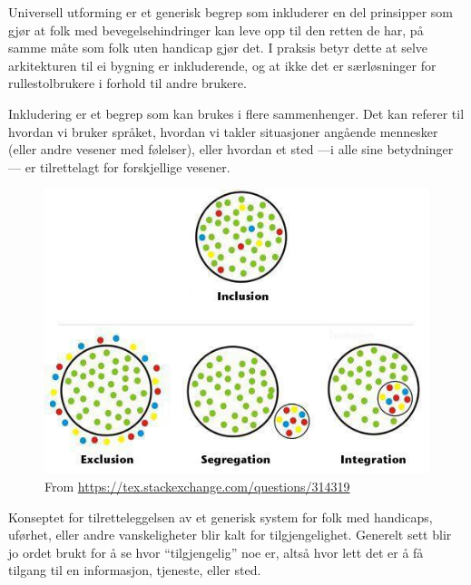 \documentclass{../../myassignment}
\begin{document}
	\begin{answer}
		\begin{description}[style=nextline]
			\item [Universell utforming]  Universell utforming er et generisk begrep som inkluderer en del prinsipper som gjør at folk med bevegelsehindringer kan leve opp til den retten de har, på samme måte som folk uten handicap gjør det. I praksis betyr dette at selve arkitekturen til ei bygning er inkluderende, og at ikke det er særløsninger for rullestolbrukere i forhold til andre brukere.

			\item [Inkludering] Inkludering er et begrep som kan brukes i flere sammenhenger. Det kan referer til hvordan vi bruker språket, hvordan vi takler situasjoner angående mennesker (eller andre vesener med følelser), eller hvordan et sted ---i alle sine betydninger--- er tilrettelagt for forskjellige vesener.

			\begin{figure}[h]\begin{center}
					\includegraphics[scale=0.6]{inclusion.jpg}
					\caption{From \url{https://tex.stackexchange.com/questions/314319}}
			\end{center}\end{figure}

			\item [Tilgjengelighet] Konseptet for tilretteleggelsen av et generisk system for folk med handicaps, uførhet, eller andre vanskeligheter blir kalt for tilgjengelighet. Generelt sett blir jo ordet brukt for å se hvor ``tilgjengelig'' noe er, altså hvor lett det er å få tilgang til en informasjon, tjeneste, eller sted.


\end{description}
\end{answer}
\end{document}
